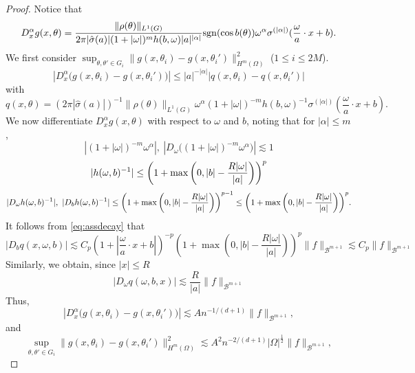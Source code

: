 \begin{proof}
Notice that
\begin{equation}
D_x^\alpha g(x,\theta) = {\|\rho(\theta)\|_{L^1(G)}\over 2\pi |\hat \sigma (a)|(1+|\omega|)^{m}h(b,\omega)|a|^{|\alpha|} }{\rm sgn} (\cos b(\theta))  \omega^\alpha \sigma^{(|\alpha|)} ({\omega\over a}\cdot x+b).
\end{equation}
We first consider $\sup_{\theta,\theta'\in G_i} \| g(x,\theta_i) - g(x,\theta_i')\|^2_{H^m(\Omega)} $ ($1\le i\le 2M$). 
\begin{equation}
| D_x^\alpha \big (g(x,\theta_i) - g(x,\theta_i')\big )|\le |a|^{-|\alpha|}| q(x, \theta_i) - q(x, \theta_i')|
\end{equation}
with 
\begin{equation}
q(x, \theta)=(2 \pi|\hat{\sigma}(a)|)^{-1} \|\rho(\theta)\|_{L^1(G)} \omega^{\alpha}(1+|\omega|)^{-m} h(b, \omega)^{-1} \sigma^{(|\alpha|)}\left(\frac{\omega}{a} \cdot x+b\right).
\end{equation}
We now differentiate $D_x^\alpha g(x,\theta)$ with respect to $\omega$ and $b$, noting that for $|\alpha|\le m$,
\begin{equation}
| (1 + |\omega|)^{-m}\omega^\alpha|,\ |D_\omega \big((1 + |\omega|)^{-m}\omega^\alpha\big ) | \lesssim 1
\end{equation}
\begin{equation}
| h(\omega, b)^{-1}|\le \bigg (1+ \max \bigg(0, |b|-{R|\omega|\over |a|}\bigg )\bigg )^{p}
\end{equation}
\begin{equation}
|D_\omega h(\omega, b)^{-1}|,\ |D_b h(\omega, b)^{-1}|\le \bigg (1+ \max \bigg(0, |b|-{R|\omega|\over |a|}\bigg )\bigg )^{p-1}\le \bigg (1+ \max \bigg(0, |b|-{R|\omega|\over |a|}\bigg )\bigg )^{p}.
\end{equation}
It follows from \eqref{eq:assdecay} that
\begin{equation}
\left|D_{b} q(x, \omega, b)\right| \lesssim C_{p}\left(1+\left|\frac{\omega}{a} \cdot x+b\right|\right)^{-p}\left(1+\max \left(0,|b|-\frac{R|\omega|}{|a|}\right)\right)^{p}\|f\|_{\mathscr{B}^{m+1}}
\lesssim C_{p}\|f\|_{\mathscr{B}^{m+1}}
\end{equation} 
Similarly, we obtain, since $|x| \leq R$
\[
\left|D_{\omega} q(\omega, b, x)\right| \lesssim \frac{R}{|a|}\|f\|_{\mathscr{B}^{m+1}}  
\]
Thus,
\begin{equation}
| D_x^\alpha \big (g(x,\theta_i) - g(x,\theta_i')\big )|\lesssim   A n^{-1 /(d+1)}\|f\|_{\mathscr{B}^{m+1}},
\end{equation}
and
\begin{equation}
\sup_{\theta,\theta'\in G_i} \| g(x,\theta_i) - g(x,\theta_i')\|^2_{H^m(\Omega)} \lesssim   A^2 n^{-2 /(d+1)}|\Omega|^{\frac{1}{2}}\|f\|_{\mathscr{B}^{m+1}},
\end{equation}
 

\end{proof}
